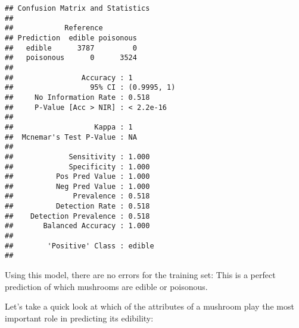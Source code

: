 \documentclass[]{article}
\newenvironment{Shaded}{\begin{snugshade}}{\end{snugshade}}
\newcommand{\KeywordTok}[1]{\textcolor[rgb]{0.13,0.29,0.53}{\textbf{#1}}}
\newcommand{\DataTypeTok}[1]{\textcolor[rgb]{0.13,0.29,0.53}{#1}}
\newcommand{\StringTok}[1]{\textcolor[rgb]{0.31,0.60,0.02}{#1}}
\newcommand{\CommentTok}[1]{\textcolor[rgb]{0.56,0.35,0.01}{\textit{#1}}}
\newcommand{\OperatorTok}[1]{\textcolor[rgb]{0.81,0.36,0.00}{\textbf{#1}}}
\newcommand{\NormalTok}[1]{#1}
\begin{document}
\begin{verbatim}
## Confusion Matrix and Statistics
## 
##            Reference
## Prediction  edible poisonous
##   edible      3787         0
##   poisonous      0      3524
##                                      
##                Accuracy : 1          
##                  95% CI : (0.9995, 1)
##     No Information Rate : 0.518      
##     P-Value [Acc > NIR] : < 2.2e-16  
##                                      
##                   Kappa : 1          
##  Mcnemar's Test P-Value : NA         
##                                      
##             Sensitivity : 1.000      
##             Specificity : 1.000      
##          Pos Pred Value : 1.000      
##          Neg Pred Value : 1.000      
##              Prevalence : 0.518      
##          Detection Rate : 0.518      
##    Detection Prevalence : 0.518      
##       Balanced Accuracy : 1.000      
##                                      
##        'Positive' Class : edible     
## 
\end{verbatim}

Using this model, there are no errors for the training set: This is a
perfect prediction of which mushrooms are edible or poisonous.

Let's take a quick look at which of the attributes of a mushroom play
the most important role in predicting its edibility:

\begin{Shaded}
\end{Shaded}
\end{document}
